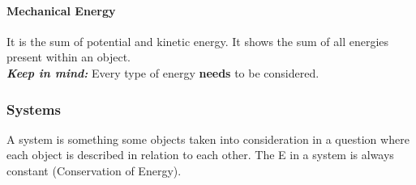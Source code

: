 \documentclass{article} %
\theoremstyle{theorem}
\theoremstyle{definition}
\begin{document}
            \paragraph{Mechanical Energy}
            It is the sum of potential and kinetic energy. It shows the sum of all energies present within an object.
            \\\emph{\textbf{Keep in mind:}} Every type of energy \textbf{needs} to be considered.
        \subsubsection{Systems}
            A system is something some objects taken into consideration in a question where each object is described in relation to each other.
            The E in a system is always constant (Conservation of Energy).
\end{document}
